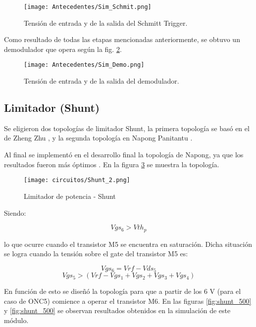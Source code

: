 \begin{figure}[H]
\centering
\texttt{[image: Antecedentes/Sim\_Schmit.png]}
\caption{Tensión de entrada y de la salida del Schmitt Trigger.}
\label{fig:Sim_Schmit}
\end{figure}

Como resultado de todas las etapas mencionadas anteriormente, se obtuvo un demodulador que opera según la fig. \ref{fig:Sim_demo}.

\begin{figure}[H]
\centering
\texttt{[image: Antecedentes/Sim\_Demo.png]}
\caption{Tensión de entrada y de la salida del demodulador.}
\label{fig:Sim_demo}
\end{figure}



\subsection{Limitador (Shunt)} \label{subsec:limit}

Se eligieron dos topologías de limitador Shunt, la primera topología se basó en el de Zheng Zhu \cite{shunt1}, y la segunda topología en Napong Panitantu \cite{shunt2}.

Al final se implementó en el desarrollo final la topología de Napong, ya que los resultados fueron más óptimos \cite{Proyecciones_1017}. En la figura \ref{fig:shunt2} se muestra la topología.

\begin{figure}[H]
\centering
\texttt{[image: circuitos/Shunt\_2.png]}
\caption{Limitador de potencia - Shunt}
\label{fig:shunt2}
\end{figure}

Siendo:

$$Vgs_{6} > Vth_{p}$$

lo que ocurre cuando el transistor M5 se encuentra en saturación. Dicha situación se logra cuando la tensión sobre el gate del transistor M5 es:

$$Vgs_{6} = Vrf - Vds_{5}$$
$$Vgs_{5} > (Vrf - Vgs_{1} + Vgs_{2} + Vgs_{3} + Vgs_{4}) $$

En función de esto se diseñó la topología para que a partir de los 6 V (para el caso de ONC5) comience a operar el transistor M6. En las figuras \ref{fig:shunt_500} y \ref{fig:shunt_500} se observan resultados obtenidos en la simulación de este módulo.